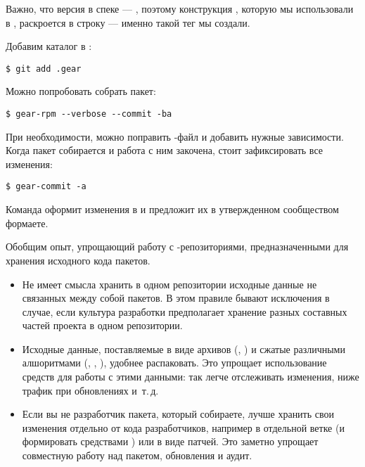 Важно, что версия в спеке --- , поэтому конструкция ,
которую мы использовали в , раскроется в строку  ---
именно такой тег  мы создали.

Добавим каталог  в :
\begin{verbatim}
$ git add .gear
\end{verbatim}

Можно попробовать собрать пакет:
\begin{verbatim}
$ gear-rpm --verbose --commit -ba
\end{verbatim}

При необходимости, можно поправить -файл и добавить нужные зависимости.
Когда пакет собирается и работа с ним закочена, стоит зафиксировать все изменения:
\begin{verbatim}
$ gear-commit -a
\end{verbatim}
Команда оформит изменения в и предложит их в утвержденном сообществом формаете.

Обобщим опыт, упрощающий работу с -репозиториями, предназначенными для хранения исходного кода пакетов.

\begin{itemize}
	\item {}

	Не имеет смысла хранить в одном репозитории исходные данные не связанных между собой пакетов.
		В этом правиле бывают исключения в случае, если культура разработки предполагает хранение
		разных составных частей проекта в одном репозитории.
	\item  {}

	Исходные данные, поставляемые в виде архивов (, ) и сжатые различными
		алшоритмами (, , ), удобнее распаковать. Это упрощает
		использование средств  для работы с этими данными: так легче отслеживать изменения,
		ниже трафик при обновлениях и~т.\,д.
	\item {}

	Если вы не разработчик пакета, который собираете, лучше хранить свои изменения отдельно
		от кода разработчиков, например в отдельной ветке (и формировать  средствами )
		или в виде патчей. Это заметно упрощает совместную работу над пакетом, обновления и аудит.
\end{itemize}
